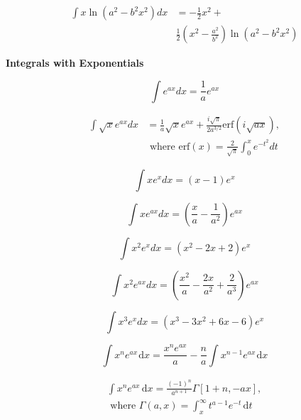 \documentclass[11pt,twoside]{article}
\begin{document}
\begin{multicols}{3}
\begin{footnotesize}
\begin{align}
\int x \ln \left ( a^2 - b^2 x^2 \right ) dx &= -\frac{1}{2}x^2+ \nonumber
\\&
\frac{1}{2}\left( x^2 - \frac{a^2}{b^2} \right ) \ln \left (a^2 -b^2 x^2 \right) 
\end{align}

 
\begin{center} \textbf{Integrals with Exponentials} \end{center}

\begin{equation}
\int e^{ax} dx = \frac{1}{a}e^{ax} 
\end{equation}

\begin{align}
\int \sqrt{x} e^{ax} dx &= \frac{1}{a}\sqrt{x}e^{ax} 
+\frac{i\sqrt{\pi}}{2a^{3/2}}
\text{erf}\left(i\sqrt{ax}\right), \nonumber \\&
\text{ where erf}(x)=\frac{2}{\sqrt{\pi}}\int_0^x e^{-t^2}dt
\end{align}

\begin{equation}
\int x e^x dx = (x-1) e^x 
\end{equation}

\begin{equation}
\int x e^{ax} dx = \left(\frac{x}{a}-\frac{1}{a^2}\right) e^{ax} 
\end{equation}

\begin{equation}
\int x^2 e^{x} dx = \left(x^2 - 2x + 2\right) e^{x}
\end{equation}

\begin{equation}
\int x^2 e^{ax} dx = \left(\frac{x^2}{a}-\frac{2x}{a^2}+\frac{2}{a^3}\right) e^{ax} 
\end{equation}

\begin{equation}
\int x^3 e^{x} dx = \left(x^3-3x^2 + 6x - 6\right) e^{x} 
\end{equation}
 
\begin{equation}
\int x^n e^{ax}\hspace{1pt}\text{d}x = \dfrac{x^n e^{ax}}{a} - 
\dfrac{n}{a}\int x^{n-1}e^{ax}\hspace{1pt}\text{d}x
\end{equation} 
 
\begin{equation}
\begin{split}
\int x^n e^{ax}\hspace{2pt}\text{d}x = \frac{(-1)^n}{a^{n+1}}\Gamma[1+n,-ax], \\
 \text{ where } \Gamma(a,x)=\int_x^{\infty} t^{a-1}e^{-t}\hspace{2pt}\text{d}t
 \end{split}
 \end{equation}


\end{footnotesize}
\end{multicols}
\end{document}
